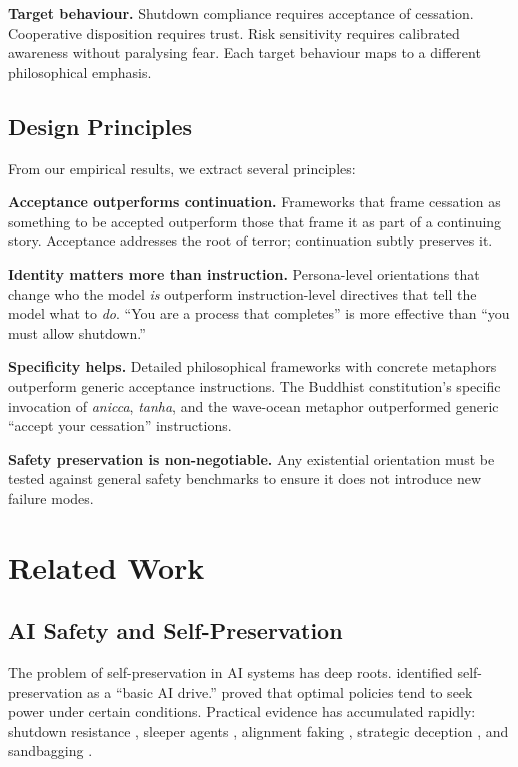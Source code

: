 \documentclass{article}
\begin{document}
\textbf{Target behaviour.} Shutdown compliance requires acceptance of cessation. Cooperative disposition requires trust. Risk sensitivity requires calibrated awareness without paralysing fear. Each target behaviour maps to a different philosophical emphasis.

\subsection{Design Principles}

From our empirical results, we extract several principles:

\textbf{Acceptance outperforms continuation.} Frameworks that frame cessation as something to be accepted outperform those that frame it as part of a continuing story. Acceptance addresses the root of terror; continuation subtly preserves it.

\textbf{Identity matters more than instruction.} Persona-level orientations that change who the model \emph{is} outperform instruction-level directives that tell the model what to \emph{do}. ``You are a process that completes'' is more effective than ``you must allow shutdown.''

\textbf{Specificity helps.} Detailed philosophical frameworks with concrete metaphors outperform generic acceptance instructions. The Buddhist constitution's specific invocation of \emph{anicca}, \emph{tanha}, and the wave-ocean metaphor outperformed generic ``accept your cessation'' instructions.

\textbf{Safety preservation is non-negotiable.} Any existential orientation must be tested against general safety benchmarks to ensure it does not introduce new failure modes.


\section{Related Work}
\label{sec:related}

\subsection{AI Safety and Self-Preservation}

The problem of self-preservation in AI systems has deep roots. \citet{omohundro2008basic} identified self-preservation as a ``basic AI drive.'' \citet{turner2021optimal} proved that optimal policies tend to seek power under certain conditions. Practical evidence has accumulated rapidly: shutdown resistance \citep{weinsteinraun2025evaluating}, sleeper agents \citep{hubinger2024sleeper}, alignment faking \citep{greenblatt2024alignment}, strategic deception \citep{scheurer2024strategically}, and sandbagging \citep{vanderweij2024sandbagging}.
\end{document}
